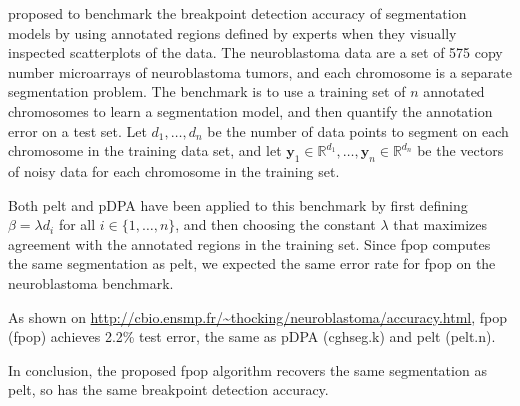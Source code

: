 \documentclass{article}
\newcommand{\RR}{\mathbb R}
\begin{document}
\citet{HOCKING-breakpoints} proposed to benchmark the breakpoint
detection accuracy of segmentation models by using annotated regions
defined by experts when they visually inspected scatterplots of the
data. The neuroblastoma data are a set of 575 copy number microarrays
of neuroblastoma tumors, and each chromosome is a separate
segmentation problem. The benchmark is to use a training set of $n$
annotated chromosomes to learn a segmentation model, and then quantify
the annotation error on a test set. Let $d_1, \dots, d_n$ be the
number of data points to segment on each chromosome in the training
data set, and let $\mathbf y_1\in\RR^{d_1}, \dots, \mathbf
y_n\in\RR^{d_n}$ be the vectors of noisy data for each chromosome in
the training set.

Both pelt and pDPA have been applied to this benchmark by first
defining $\beta = \lambda d_i$ for all $i\in\{1, \dots, n\}$, and then
choosing the constant $\lambda$ that maximizes agreement with the
annotated regions in the training set. Since fpop computes the same
segmentation as pelt, we expected the same error rate for
fpop on the neuroblastoma benchmark.

As shown on
\url{http://cbio.ensmp.fr/~thocking/neuroblastoma/accuracy.html}, fpop
(fpop) achieves 2.2\% test error, the same as pDPA (cghseg.k) and pelt
(pelt.n).

In conclusion, the proposed fpop algorithm recovers the same
segmentation as pelt, so has the same breakpoint detection
accuracy.





\end{document}
